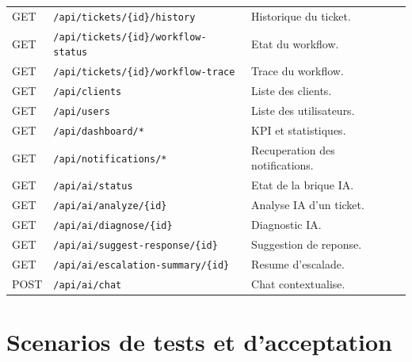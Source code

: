 \documentclass[12pt,a4paper,oneside]{report}
\begin{document}
\begin{longtable}{>{\raggedright\arraybackslash}p{2.4cm} >{\raggedright\arraybackslash}p{4.8cm} >{\raggedright\arraybackslash}p{5.8cm}}
GET & \texttt{/api/tickets/\{id\}/history} & Historique du ticket. \\
GET & \texttt{/api/tickets/\{id\}/workflow-status} & Etat du workflow. \\
GET & \texttt{/api/tickets/\{id\}/workflow-trace} & Trace du workflow. \\
GET & \texttt{/api/clients} & Liste des clients. \\
GET & \texttt{/api/users} & Liste des utilisateurs. \\
GET & \texttt{/api/dashboard/*} & KPI et statistiques. \\
GET & \texttt{/api/notifications/*} & Recuperation des notifications. \\
GET & \texttt{/api/ai/status} & Etat de la brique IA. \\
GET & \texttt{/api/ai/analyze/\{id\}} & Analyse IA d'un ticket. \\
GET & \texttt{/api/ai/diagnose/\{id\}} & Diagnostic IA. \\
GET & \texttt{/api/ai/suggest-response/\{id\}} & Suggestion de reponse. \\
GET & \texttt{/api/ai/escalation-summary/\{id\}} & Resume d'escalade. \\
POST & \texttt{/api/ai/chat} & Chat contextualise. \\
\bottomrule
\end{longtable}

\chapter{Scenarios de tests et d'acceptation}
\end{document}
